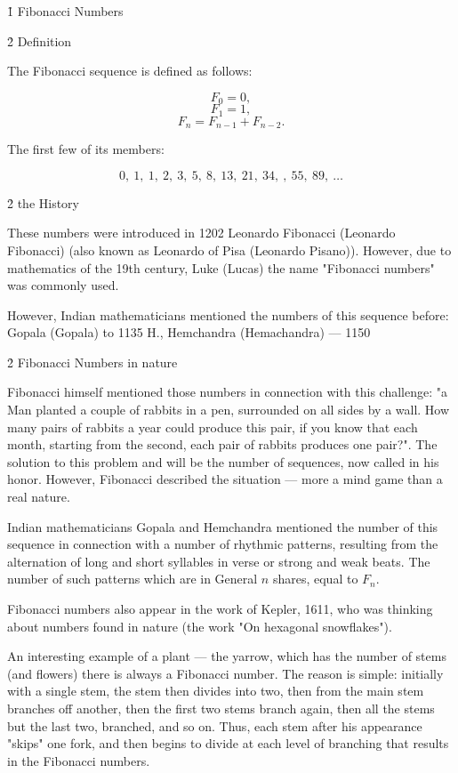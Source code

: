 \h1{ Fibonacci Numbers }


\h2{ Definition }

The Fibonacci sequence is defined as follows:

$$ F_0 = 0, $$
$$ F_1 = 1, $$
$$ F_n = F_{n-1} + F_{n-2}. $$

The first few of its members:

$$ 0, ~ 1, ~ 1, ~ 2, ~ 3, ~ 5, ~ 8, ~ 13, ~ 21, ~ 34, ~ , ~ 55, ~ 89, ~ \ldots $$


\h2{ the History }

These numbers were introduced in 1202 Leonardo Fibonacci (Leonardo Fibonacci) (also known as Leonardo of Pisa (Leonardo Pisano)). However, due to mathematics of the 19th century, Luke (Lucas) the name "Fibonacci numbers" was commonly used.

However, Indian mathematicians mentioned the numbers of this sequence before: Gopala (Gopala) to 1135 H., Hemchandra (Hemachandra) --- 1150


\h2{ Fibonacci Numbers in nature }

Fibonacci himself mentioned those numbers in connection with this challenge: "a Man planted a couple of rabbits in a pen, surrounded on all sides by a wall. How many pairs of rabbits a year could produce this pair, if you know that each month, starting from the second, each pair of rabbits produces one pair?". The solution to this problem and will be the number of sequences, now called in his honor. However, Fibonacci described the situation --- more a mind game than a real nature.

Indian mathematicians Gopala and Hemchandra mentioned the number of this sequence in connection with a number of rhythmic patterns, resulting from the alternation of long and short syllables in verse or strong and weak beats. The number of such patterns which are in General $n$ shares, equal to $F_n$.

Fibonacci numbers also appear in the work of Kepler, 1611, who was thinking about numbers found in nature (the work "On hexagonal snowflakes").

An interesting example of a plant --- the yarrow, which has the number of stems (and flowers) there is always a Fibonacci number. The reason is simple: initially with a single stem, the stem then divides into two, then from the main stem branches off another, then the first two stems branch again, then all the stems but the last two, branched, and so on. Thus, each stem after his appearance "skips" one fork, and then begins to divide at each level of branching that results in the Fibonacci numbers.

